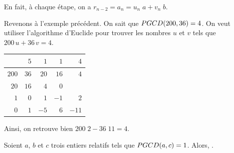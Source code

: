 		En fait, \`a chaque \'etape, on a
		$
			r_{n-2} = a_{n} = u_{n} \; a + v_{n} \; b
		$.
		
		\begin{ex}
		Revenons \`a l'exemple pr\'ec\'edent.%
		On sait que $PGCD(200,36) = 4$.
		On veut utiliser l'algorithme d'Euclide pour trouver les nombres $u$ et $v$ tels que 
		$200 \, u + 36 \, v = 4$.
		
			\begin{tabular}{|r|r|r|r|r|}			\hline
					& $5$	& $1$	& $1$	& $4$		\\ \hline
			$200$	& $36$	& $20$	& $16$	& $4$		\\ \hline
			$20$	& $16$	& $4$	& $0$	&			\\ \hline
			$1$		& $0$	& $1$	& $-1$	& $2$		\\ \hline
			$0$		& $1$	& $-5$	& $6$	& $-11$	\\ \hline
			\end{tabular}
		
		Ainsi, on retrouve bien $200 \; 2 - 36 \; 11 = 4$.
		\end{ex}
            \begin{thm}
                  Soient $a$, $b$ et $c$ trois entiers relatifs tels que $PGCD(a,c) = 1$.
                  Alors, .
            \end{thm}
